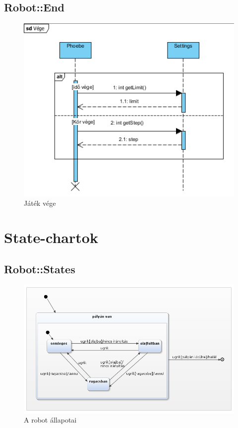 \subsection{Robot::End}
\begin{figure}[h]
\begin{center}
\includegraphics[width=17cm]{images/end.PNG}
\caption{Játék vége}
\label{fig:example11}
\end{center}
\end{figure}
\pagebreak

\section{State-chartok}

\subsection{Robot::States}
\begin{figure}[h]
\begin{center}
\includegraphics[width=17cm]{images/robot.png}
\caption{A robot állapotai}
\label{fig:example12}
\end{center}
\end{figure}
